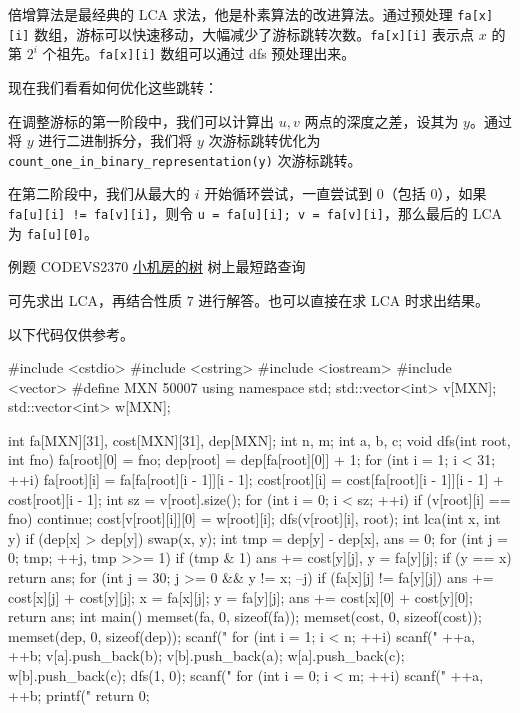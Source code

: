 倍增算法是最经典的 LCA 求法，他是朴素算法的改进算法。通过预处理 \texttt{fa[x][i]} 数组，游标可以快速移动，大幅减少了游标跳转次数。\texttt{fa[x][i]} 表示点 $x$ 的第 $2^i$ 个祖先。\texttt{fa[x][i]} 数组可以通过 dfs 预处理出来。

现在我们看看如何优化这些跳转：  

在调整游标的第一阶段中，我们可以计算出 $u,v$ 两点的深度之差，设其为 $y$。通过将 $y$ 进行二进制拆分，我们将 $y$ 次游标跳转优化为 \texttt{count\_one\_in\_binary\_representation(y)} 次游标跳转。  

在第二阶段中，我们从最大的 $i$ 开始循环尝试，一直尝试到 $0$（包括 $0$），如果 \texttt{fa[u][i] != fa[v][i]}，则令 \texttt{u = fa[u][i]; v = fa[v][i]}，那么最后的 LCA 为 \texttt{fa[u][0]}。

\begin{NOTE}{例题}{}
CODEVS2370 \href{http://codevs.cn/problem/2370/}{小机房的树}
树上最短路查询

\end{NOTE}


可先求出 LCA，再结合性质 $7$ 进行解答。也可以直接在求 LCA 时求出结果。  

以下代码仅供参考。

\begin{cppcode}
#include <cstdio>
#include <cstring>
#include <iostream>
#include <vector>
#define MXN 50007
using namespace std;
std::vector<int> v[MXN];
std::vector<int> w[MXN];

int fa[MXN][31], cost[MXN][31], dep[MXN];
int n, m;
int a, b, c;
void dfs(int root, int fno) {
  fa[root][0] = fno;
  dep[root] = dep[fa[root][0]] + 1;
  for (int i = 1; i < 31; ++i) {
    fa[root][i] = fa[fa[root][i - 1]][i - 1];
    cost[root][i] = cost[fa[root][i - 1]][i - 1] + cost[root][i - 1];
  }
  int sz = v[root].size();
  for (int i = 0; i < sz; ++i) {
    if (v[root][i] == fno) continue;
    cost[v[root][i]][0] = w[root][i];
    dfs(v[root][i], root);
  }
}
int lca(int x, int y) {
  if (dep[x] > dep[y]) swap(x, y);
  int tmp = dep[y] - dep[x], ans = 0;
  for (int j = 0; tmp; ++j, tmp >>= 1)
    if (tmp & 1) ans += cost[y][j], y = fa[y][j];
  if (y == x) return ans;
  for (int j = 30; j >= 0 && y != x; --j) {
    if (fa[x][j] != fa[y][j]) {
      ans += cost[x][j] + cost[y][j];
      x = fa[x][j];
      y = fa[y][j];
    }
  }
  ans += cost[x][0] + cost[y][0];
  return ans;
}
int main() {
  memset(fa, 0, sizeof(fa));
  memset(cost, 0, sizeof(cost));
  memset(dep, 0, sizeof(dep));
  scanf("%
  for (int i = 1; i < n; ++i) {
    scanf("%
    ++a, ++b;
    v[a].push_back(b);
    v[b].push_back(a);
    w[a].push_back(c);
    w[b].push_back(c);
  }
  dfs(1, 0);
  scanf("%
  for (int i = 0; i < m; ++i) {
    scanf("%
    ++a, ++b;
    printf("%
  }
  return 0;
}
\end{cppcode}

